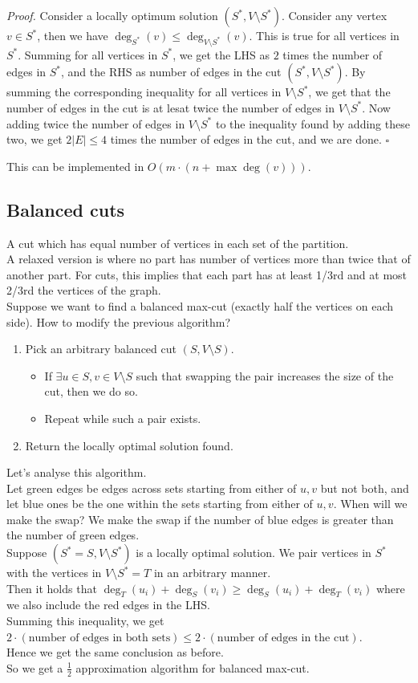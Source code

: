 \documentclass[a4paper]{article}
\newenvironment{proof}{\begin{breakbox}\textit{Proof.}}{\hfill$\square$\end{breakbox}}
\newcommand{\nl}{\vspace{0.2cm}\\}
\begin{document}
\begin{proof}
Consider a locally optimum solution $(S^*, V \setminus S^*)$. Consider any vertex $v \in S^*$, then we have $\deg_{S^*}(v) \le \deg_{V \setminus S^*}(v)$. This is true for all vertices in $S^*$.
Summing for all vertices in $S^*$, we get the LHS as $2$ times the number of edges in $S^*$, and the RHS as number of edges in the cut $(S^*, V \setminus S^*)$. By summing the corresponding inequality
for all vertices in $V \setminus S^*$, we get that the number of edges in the cut is at lesat twice the number of edges in $V \setminus S^*$. Now adding twice the number of edges in $V \setminus
S^*$ to the inequality found by adding these two, we get $2|E| \le 4$ times the number of edges in the cut, and we are done.
\end{proof}
This can be implemented in $O(m \cdot (n + \max \deg(v)))$.\nl

\subsection{Balanced cuts}
A cut which has equal number of vertices in each set of the partition.\nl
A relaxed version is where no part has number of vertices more than twice that of another part. For cuts, this implies that each part has at least 1/3rd and at most 2/3rd the vertices of the
graph.\nl
Suppose we want to find a balanced max-cut (exactly half the vertices on each side). How to modify the previous algorithm?
\begin{enumerate}
    \item Pick an arbitrary balanced cut $(S, V \setminus S)$.
        \begin{itemize}
            \item If $\exists u \in S, v \in V \setminus S$ such that swapping the pair increases the size of the cut, then we do so.
            \item Repeat while such a pair exists.
        \end{itemize}
    \item Return the locally optimal solution found.
\end{enumerate}
Let's analyse this algorithm.\nl
Let green edges be edges across sets starting from either of $u, v$ but not both, and let blue ones be the one within the sets starting from either of $u, v$.
When will we make the swap? We make the swap if the number of blue edges is greater than the number of green edges.\nl
Suppose $(S^* = S, V \setminus S^*)$ is a locally optimal solution. We pair vertices in $S^*$ with the vertices in $V \setminus S^* = T$ in an arbitrary manner.\nl
Then it holds that $\deg_T (u_i) + \deg_S (v_i) \ge \deg_S(u_i) + \deg_T(v_i)$ where we also include the red edges in the LHS.\nl
Summing this inequality, we get $2 \cdot (\text{number of edges in both sets}) \le 2 \cdot (\text{number of edges in the cut})$.\nl
Hence we get the same conclusion as before.\nl
So we get a $\frac{1}{2}$ approximation algorithm for balanced max-cut.
\end{document}
